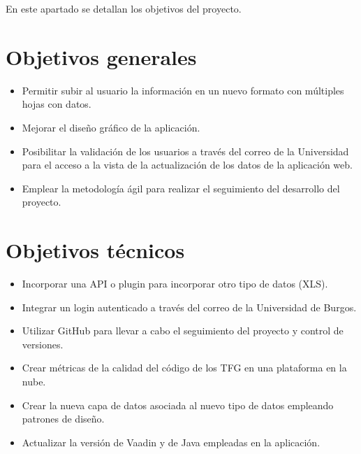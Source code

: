 En este apartado se detallan los objetivos del proyecto.

\section{Objetivos generales}
\begin{itemize}
	\item Permitir subir al usuario la información en un nuevo formato con múltiples hojas con datos.
	\item Mejorar el diseño gráfico de la aplicación.
	\item Posibilitar la validación de los usuarios a través del correo de la Universidad para el acceso a la vista de la actualización de los datos de la aplicación web.
	\item Emplear la metodología ágil para realizar el seguimiento del desarrollo del proyecto.
\end{itemize}

\section{Objetivos técnicos}
\begin{itemize}
	\item Incorporar una API o plugin para incorporar otro tipo de datos (XLS).
	\item Integrar un login autenticado a través del correo de la Universidad de Burgos.
	\item Utilizar GitHub para llevar a cabo el seguimiento del proyecto y control de versiones.
	\item Crear métricas de la calidad del código de los TFG en una plataforma en la nube.
	\item Crear la nueva capa de datos asociada al nuevo tipo de datos empleando patrones de diseño.
	\item Actualizar la versión de Vaadin y de Java empleadas en la aplicación.
\end{itemize}